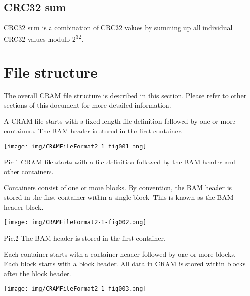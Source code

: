 \documentclass[a4paper]{article}
\begin{document}
\subsection{\textbf{CRC32 sum}}
CRC32 sum is a combination of CRC32 values by summing up all individual CRC32 values modulo 2\textsuperscript{32}. 

\section{\textbf{File structure}}

The overall CRAM file structure is described in this section. Please refer to other 
sections of this document for more detailed information. 

A CRAM file starts with a fixed length file definition followed by one or more 
containers. The BAM header is stored in the first container.

\texttt{[image: img/CRAMFileFormat2-1-fig001.png]}

Pic.1 CRAM file starts with a file definition followed by the BAM header and other 
containers.

Containers consist of one or more blocks. By convention, the BAM header is stored 
in the first container within a single block. This is known as the BAM header block.

\texttt{[image: img/CRAMFileFormat2-1-fig002.png]}

Pic.2 The BAM header is stored in the first container.

Each container starts with a container header followed by one or more blocks. Each 
block starts with a block header. All data in CRAM is stored within blocks after 
the block header.

\texttt{[image: img/CRAMFileFormat2-1-fig003.png]}
\end{document}
